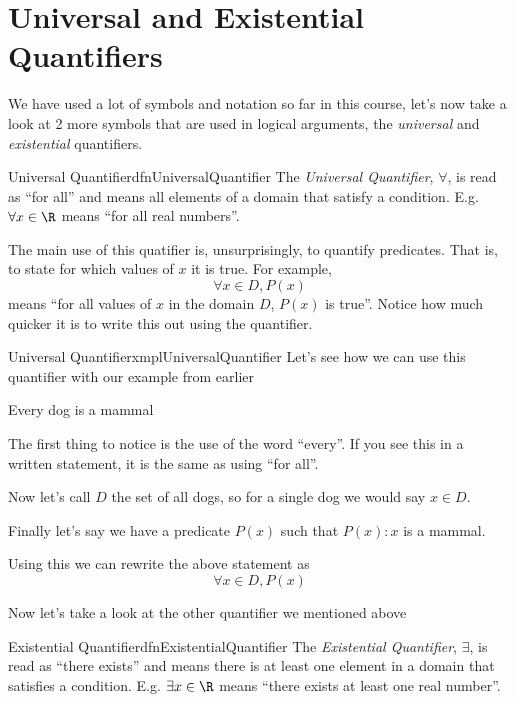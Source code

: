 \section{Universal and Existential Quantifiers}
We have used a lot of symbols and notation so far in this course, let's now take a look at 2 more symbols that are used in logical arguments, the \emph{universal} and \emph{existential} quantifiers.

\begin{dfn}[label={def:universalQuantifier}]{Universal Quantifier}{dfnUniversalQuantifier}
    The \emph{Universal Quantifier}, $\forall$, is read as ``for all'' and means all elements of a domain that satisfy a condition. E.g. $\forall x \in \R$ means ``for all real numbers''.
\end{dfn}
The main use of this quatifier is, unsurprisingly, to quantify predicates. That is, to state for which values of $x$ it is true. For example,
$$\forall x \in D, P(x)$$
means ``for all values of $x$ in the domain $D$, $P(x)$ is true''. Notice how much quicker it is to write this out using the quantifier.

\begin{exmpl}[label={exmpl:universalQuantifier}]{Universal Quantifier}{xmplUniversalQuantifier}
    Let's see how we can use this quantifier with our example from earlier

    \begin{center}
        Every dog is a mammal
    \end{center}

    The first thing to notice is the use of the word ``every''. If you see this in a written statement, it is the same as using ``for all''.

    Now let's call $D$ the set of all dogs, so for a single dog we would say $x \in D$.

    Finally let's say we have a predicate $P(x)$ such that $P(x): x$ is a mammal.

    Using this we can rewrite the above statement as
    $$\forall x \in D, P(x)$$
\end{exmpl}

Now let's take a look at the other quantifier we mentioned above

\begin{dfn}[label={def:existentialQuantifier}]{Existential Quantifier}{dfnExistentialQuantifier}
    The \emph{Existential Quantifier}, $\exists$, is read as ``there exists'' and means there is at least one element in a domain that satisfies a condition. E.g. $\exists x \in \R$ means ``there exists at least one real number''.
\end{dfn}

